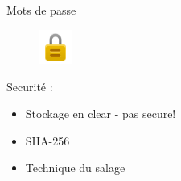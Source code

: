 \begin{frame}{Mots de passe}
\begin{figure}[h!]
  \includegraphics[width=0.10\textwidth]{images/website_-_padlock-512}
\end{figure}
  Securité : 
  \begin{itemize}
  \item Stockage en clear - pas secure!
  \item SHA-256
  \item Technique du salage
  \end{itemize}
\end{frame}